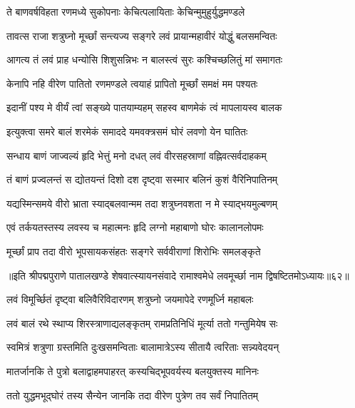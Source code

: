 \twolineshloka
{ते बाणवर्षविहता रणमध्ये सुकोपनाः}
{केचित्पलायिताः केचिन्मुमुहुर्युद्धमण्डले}%

\twolineshloka
{तावत्स राजा शत्रुघ्नो मूर्च्छां सन्त्यज्य सङ्गरे}
{लवं प्रायान्महावीरं योद्धुं बलसमन्वितः}%

\twolineshloka
{आगत्य तं लवं प्राह धन्योसि शिशुसन्निभः}
{न बालस्त्वं सुरः कश्चिच्छलितुं मां समागतः}%

\twolineshloka
{केनापि नहि वीरेण पातितो रणमण्डले}
{त्वयाहं प्रापितो मूर्च्छां समक्षं मम पश्यतः}%

\twolineshloka
{इदानीं पश्य मे वीर्यं त्वां सङ्ख्ये पातयाम्यहम्}
{सहस्व बाणमेकं त्वं मापलायस्व बालक}%

\twolineshloka
{इत्युक्त्वा समरे बालं शरमेकं समाददे}
{यमवक्त्रसमं घोरं लवणो येन घातितः}%

\twolineshloka
{सन्धाय बाणं जाज्वल्यं हृदि भेत्तुं मनो दधत्}
{लवं वीरसहस्राणां वह्निवत्सर्वदाहकम्}%

\twolineshloka
{तं बाणं प्रज्वलन्तं स द्योतयन्तं दिशो दश}
{दृष्ट्वा सस्मार बलिनं कुशं वैरिनिपातिनम्}%

\twolineshloka
{यद्यस्मिन्समये वीरो भ्राता स्याद्बलवान्मम}
{तदा शत्रुघ्नवशता न मे स्याद्भयमुल्बणम्}%

\twolineshloka
{एवं तर्कयतस्तस्य लवस्य च महात्मनः}
{हृदि लग्नो महाबाणो घोरः कालानलोपमः}%

\twolineshloka
{मूर्च्छां प्राप तदा वीरो भूपसायकसंहतः}
{सङ्गरे सर्ववीराणां शिरोभिः समलङ्कृते}%

{॥इति श्रीपद्मपुराणे पातालखण्डे शेषवात्स्यायनसंवादे रामाश्वमेधे लवमूर्च्छा नाम द्विषष्टितमोऽध्यायः॥६२॥}

\resetShloka


\twolineshloka
{लवं विमूर्च्छितं दृष्ट्वा बलिवैरिविदारणम्}
{शत्रुघ्नो जयमापेदे रणमूर्ध्नि महाबलः}%

\twolineshloka
{लवं बालं रथे स्थाप्य शिरस्त्राणाद्यलङ्कृतम्}
{रामप्रतिनिधिं मूर्त्या ततो गन्तुमियेष सः}%

\twolineshloka
{स्वमित्रं शत्रुणा ग्रस्तमिति दुःखसमन्विताः}
{बालामात्रेऽस्य सीतायै त्वरिताः सन्न्यवेदयन्}%


\twolineshloka
{मातर्जानकि ते पुत्रो बलाद्वाहमपाहरत्}
{कस्यचिद्भूपवर्यस्य बलयुक्तस्य मानिनः}%

\twolineshloka
{ततो युद्धमभूद्घोरं तस्य सैन्येन जानकि}
{तदा वीरेण पुत्रेण तव सर्वं निपातितम्}%

